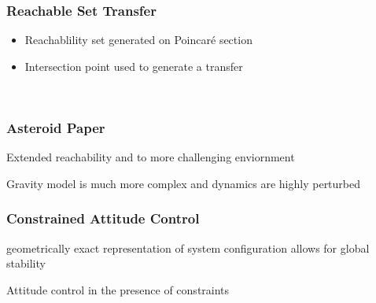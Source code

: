 \begin{frame}%
\frametitle{Reachable Set Transfer}
\begin{itemize}
    \item Reachablility set generated on Poincar\'e section
    \item<3-> Intersection point used to generate a transfer
\end{itemize}
    \begin{figure} 
    \centering 
    \begin{subfigure}[htbp]{0.5\textwidth} 
    \end{subfigure}~
    \begin{subfigure}[htbp]{0.5\textwidth} 
    \end{subfigure} 
    \end{figure}
    
\end{frame} %





\begin{frame}[t]\frametitle{Asteroid Paper}
    
Extended reachability and \Poincare to more challenging enviornment 

Gravity model is much more complex and dynamics are highly perturbed

\end{frame}


\begin{frame}[t]\frametitle{Constrained Attitude Control}
    
geometrically exact representation of system configuration allows for global stability

Attitude control in the presence of constraints

\end{frame}